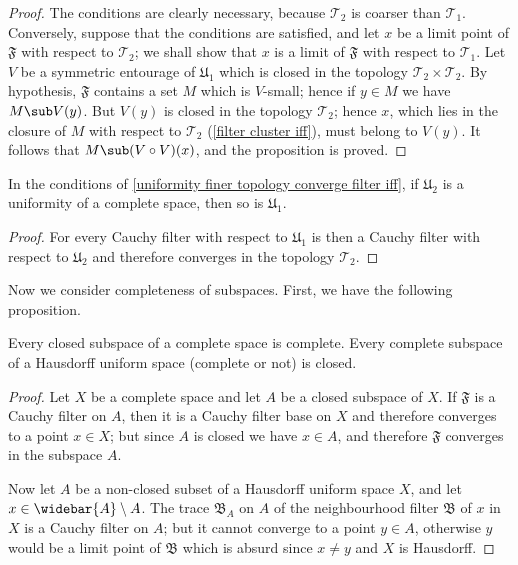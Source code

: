 \begin{proof}
The conditions are clearly necessary, because $\mathcal{T}_2$ is coarser than $\mathcal{T}_1$. Conversely, suppose that the conditions are satisfied, and let $x$ be a limit point of $\mathfrak{F}$ with respect to $\mathcal{T}_2$; we shall show that $x$ is a limit of $\mathfrak{F}$ with respect to $\mathcal{T}_1$. Let $V$ be a symmetric entourage of $\mathfrak{U}_1$ which is closed in the topology $\mathcal{T}_2\times\mathcal{T}_2$. By hypothesis, $\mathfrak{F}$ contains a set $M$ which is $V$-small; hence if $y\in M$ we have $M\sub V(y)$. But $V(y)$ is closed in the topology $\mathcal{T}_2$; hence $x$, which lies in the closure of $M$ with respect to $\mathcal{T}_2$ (\cref{filter cluster iff}), must belong to $V(y)$. It follows that $M\sub(V\circ V)(x)$, and the proposition is proved. 
\end{proof}
\begin{corollary}
In the conditions of \cref{uniformity finer topology converge filter iff}, if $\mathfrak{U}_2$ is a uniformity of a complete space, then so is $\mathfrak{U}_1$.
\end{corollary}
\begin{proof}
For every Cauchy filter with respect to $\mathfrak{U}_1$ is then a Cauchy filter with respect to $\mathfrak{U}_2$ and therefore converges in the topology $\mathcal{T}_2$.
\end{proof}
Now we consider completeness of subspaces. First, we have the following proposition.
\begin{proposition}\label{complete and subspace}
Every closed subspace of a complete space is complete. Every complete subspace of a Hausdorff uniform space (complete or not) is closed.
\end{proposition}
\begin{proof}
Let $X$ be a complete space and let $A$ be a closed subspace of $X$. If $\mathfrak{F}$ is a Cauchy filter on $A$, then it is a Cauchy filter base on $X$ and therefore converges to a point $x\in X$; but since $A$ is closed we have $x\in A$, and therefore $\mathfrak{F}$ converges in the subspace $A$.\par
Now let $A$ be a non-closed subset of a Hausdorff uniform space $X$, and let $x\in\widebar{A}\setminus A$. The trace $\mathfrak{B}_A$ on $A$ of the neighbourhood filter $\mathfrak{B}$ of $x$ in $X$ is a Cauchy filter on $A$; but it cannot converge to a point $y\in A$, otherwise $y$ would be a limit point of $\mathfrak{B}$ which is absurd since $x\neq y$ and $X$ is Hausdorff.
\end{proof}

